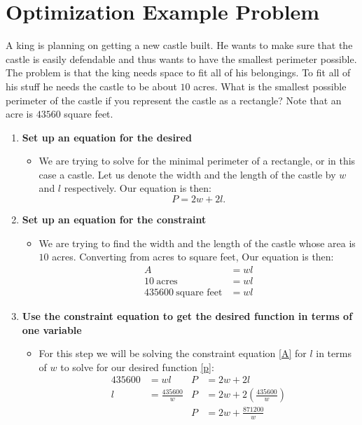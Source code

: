 \documentclass[12pt]{article}
\begin{document}
\section{Optimization Example Problem}
A king is planning on getting a new castle built. He wants to make sure that the castle is easily defendable and thus wants to have the smallest perimeter possible. The problem is that the king needs space to fit all of his belongings. To fit all of his stuff he needs the castle to be about $10$ acres. What is the smallest possible perimeter of the castle if you represent the castle as a rectangle? Note that an acre is $43560$ square feet.
\begin{enumerate}
  \item \textbf{Set up an equation for the desired}
    \begin{itemize}
      \item We are trying to solve for the minimal perimeter of a rectangle, or in this case a castle. Let us denote the width and the length of the castle by $w$ and $l$ respectively. Our equation is then:
      \begin{equation}
        P = 2w + 2l. \tag{Perimeter of Castle} \label{p}
      \end{equation}
    \end{itemize}

  \item \textbf{Set up an equation for the constraint}
    \begin{itemize}
      \item We are trying to find the width and the length of the castle whose area is $10$ acres. Converting from acres to square feet, Our equation is then:
      \begin{equation}
        \begin{split}
          A &= w l\\
          10\ \text{acres} &= wl\\
          435600\ \text{square feet} &=wl
        \end{split}
        \tag{Area of Castle} \label{A}
      \end{equation}
    \end{itemize}

  \item \textbf{Use the constraint equation to get the desired function in terms of one variable}
    \begin{itemize}
      \item For this step we will be solving the constraint equation \eqref{A} for $l$ in terms of $w$ to solve for our desired function \eqref{p}:
      \begin{equation}
        \begin{align*}
          435600 &= wl         &  P &= 2w + 2l\\
          l &= \frac{435600}{w}        &  P &= 2w + 2(\frac{435600}{w})\\
          &                 &  P &= 2w + \frac{871200}{w}\\
        \end{align*}
        \tag{Desired in terms of L} \label{DITOL}
      \end{equation}
    \end{itemize}


\end{enumerate}
\end{document}
